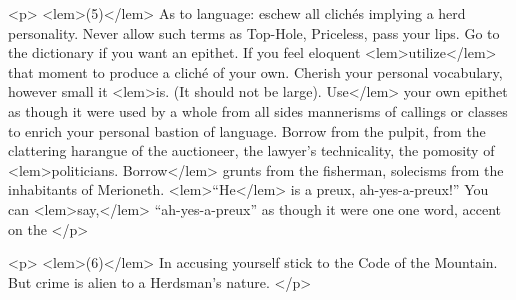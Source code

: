 {{				<p>
				\vspace{10pt}
				\noindent
<lem>(5)</lem>{}\hspace{20pt} As 
				to language: eschew all clich\'es implying a herd personality. Never allow such 
				terms as Top-Hole, Priceless,  
					{}
				pass your 
				lips. Go to the dictionary if you want an epithet. If you feel eloquent 
<lem>utilize</lem> 
					{}
				that moment to produce a clich\'e of your own. Cherish your personal vocabulary, 
				however small it 
<lem>is. (It should not be large). Use</lem> 
					{}
				your own epithet as though it 
				were used by a whole  
					{}
				from all sides mannerisms 
				of callings or classes to enrich your personal bastion of language. Borrow from the 
				pulpit, from the clattering harangue of the auctioneer, the lawyer's technicality, the 
				pomosity of 
<lem>politicians. Borrow</lem> 
					{}
				grunts from the fisherman, solecisms from the 
				inhabitants of Merioneth. 
<lem>“He</lem> 
					{}
				is a preux, ah-yes-a-preux!” You can 
<lem>say,</lem> 
					{}
				“ah-yes-a-preux” 
				as though it were one one word, accent on the  
					{}
 				</p> 

				<p>
				\vspace{10pt}
				\noindent
<lem>(6)</lem>{}\hspace{20pt} In accusing 
				yourself stick to the Code of the Mountain. But crime is alien to a 
				Herdsman's nature. 
 				</p> 

}}

